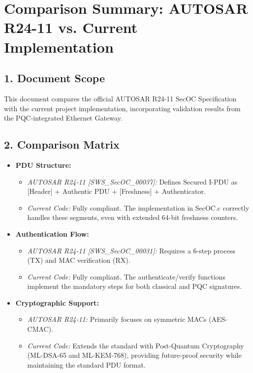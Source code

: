 \section{Comparison Summary: AUTOSAR R24-11 vs. Current Implementation}

\subsection{1. Document Scope}
This document compares the official AUTOSAR R24-11 SecOC Specification with the current project implementation, incorporating validation results from the PQC-integrated Ethernet Gateway.

\subsection{2. Comparison Matrix}
\begin{itemize}
    \item \textbf{PDU Structure:} 
        \begin{itemize}
            \item \textit{AUTOSAR R24-11 [SWS_SecOC_00037]:} Defines Secured I-PDU as [Header] + Authentic PDU + [Freshness] + Authenticator.
            \item \textit{Current Code:} Fully compliant. The implementation in SecOC.c correctly handles these segments, even with extended 64-bit freshness counters.
        \end{itemize}
    \item \textbf{Authentication Flow:}
        \begin{itemize}
            \item \textit{AUTOSAR R24-11 [SWS_SecOC_00031]:} Requires a 6-step process (TX) and MAC verification (RX).
            \item \textit{Current Code:} Fully compliant. The authenticate/verify functions implement the mandatory steps for both classical and PQC signatures.
        \end{itemize}
    \item \textbf{Cryptographic Support:}
        \begin{itemize}
            \item \textit{AUTOSAR R24-11:} Primarily focuses on symmetric MACs (AES-CMAC).
            \item \textit{Current Code:} Extends the standard with Post-Quantum Cryptography (ML-DSA-65 and ML-KEM-768), providing future-proof security while maintaining the standard PDU format.
        \end{itemize}
\end{itemize}

